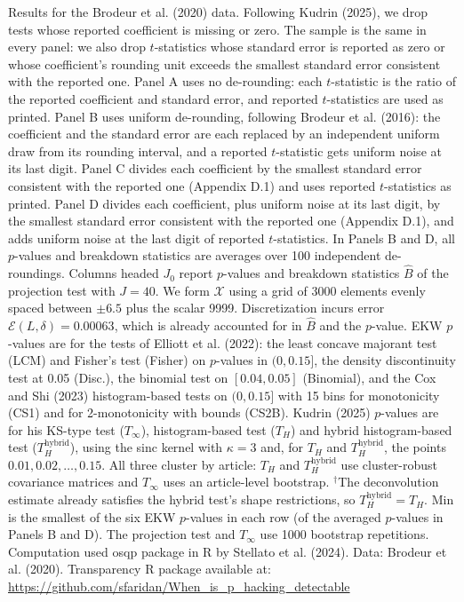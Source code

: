 \begin{table}[htbp]
\medskip
\begin{minipage}{\linewidth}
Results for the Brodeur et al. (2020) data. Following Kudrin (2025), we drop tests whose reported coefficient is missing or zero.
The sample is the same in every panel: we also drop $t$-statistics whose standard error is reported as zero or whose coefficient's rounding unit exceeds the smallest standard error consistent with the reported one.
Panel A uses no de-rounding: each $t$-statistic is the ratio of the reported coefficient and standard error, and reported $t$-statistics are used as printed.
Panel B uses uniform de-rounding, following Brodeur et al. (2016): the coefficient and the standard error are each replaced by an independent uniform draw from its rounding interval, and a reported $t$-statistic gets uniform noise at its last digit.
Panel C divides each coefficient by the smallest standard error consistent with the reported one (Appendix D.1) and uses reported $t$-statistics as printed.
Panel D divides each coefficient, plus uniform noise at its last digit, by the smallest standard error consistent with the reported one (Appendix D.1), and adds uniform noise at the last digit of reported $t$-statistics.
In Panels B and D, all $p$-values and breakdown statistics are averages over 100 independent de-roundings.
Columns headed $J_0$ report $p$-values and breakdown statistics $\widehat{B}$ of the projection test with $J=40$.
We form $\mathcal{X}$ using a grid of 3000 elements evenly spaced between $\pm 6.5$ plus the scalar 9999.
Discretization incurs error $\mathcal{E}(L,\delta)=0.00063$, which is already accounted for in $\widehat{B}$ and the $p$-value.
EKW $p$-values are for the tests of Elliott et al. (2022): the least concave majorant test (LCM) and Fisher's test (Fisher) on $p$-values in $(0,0.15]$, the density discontinuity test at 0.05 (Disc.), the binomial test on $[0.04,0.05]$ (Binomial), and the Cox and Shi (2023) histogram-based tests on $(0,0.15]$ with 15 bins for monotonicity (CS1) and for 2-monotonicity with bounds (CS2B).
Kudrin (2025) $p$-values are for his KS-type test ($T_\infty$), histogram-based test ($T_H$) and hybrid histogram-based test ($T_H^{\mathrm{hybrid}}$), using the sinc kernel with $\kappa=3$ and, for $T_H$ and $T_H^{\mathrm{hybrid}}$, the points $0.01,0.02,\ldots,0.15$.
All three cluster by article: $T_H$ and $T_H^{\mathrm{hybrid}}$ use cluster-robust covariance matrices and $T_\infty$ uses an article-level bootstrap.
$^\dagger$The deconvolution estimate already satisfies the hybrid test's shape restrictions, so $T_H^{\mathrm{hybrid}}=T_H$.
Min is the smallest of the six EKW $p$-values in each row (of the averaged $p$-values in Panels B and D).
The projection test and $T_\infty$ use 1000 bootstrap repetitions.
Computation used osqp package in R by Stellato et al. (2024). Data: Brodeur et al. (2020).
Transparency R package available at: \url{https://github.com/sfaridan/When_is_p_hacking_detectable}
\end{minipage}
\end{table}
